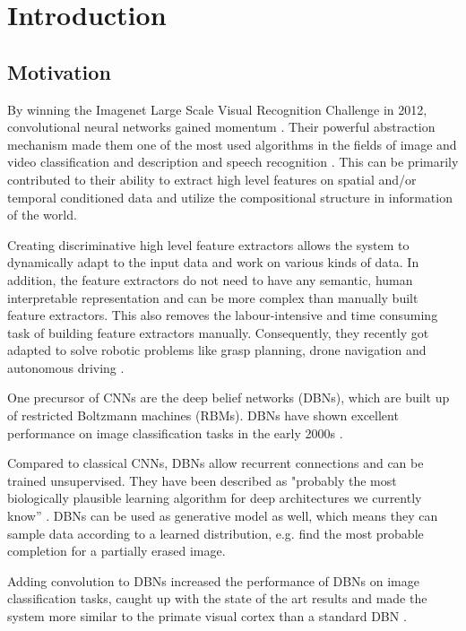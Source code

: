 \chapter{Introduction}

\section{Motivation} \label{c:motiv}

By winning the Imagenet Large Scale Visual Recognition Challenge in 2012, convolutional neural networks gained momentum \cite{NIPS2012_4824}. 
Their powerful abstraction mechanism made them one of the most used algorithms in the fields of image and video classification and description and speech recognition \cite{abdel2014convolutional}\cite{karpathy2014large}\cite{LeCun2015}\cite{szegedy2015going}. 
This can be primarily contributed to their ability to extract high level features on spatial and/or temporal conditioned data and utilize the compositional structure in information of the world.

Creating discriminative high level feature extractors allows the system to dynamically adapt to the input data and work on various kinds of data. 
In addition, the feature extractors do not need to have any semantic, human interpretable representation and can be more complex than manually built feature extractors. 
This also removes the labour-intensive and time consuming task of building feature extractors manually.
Consequently, they recently got adapted to solve robotic problems like grasp planning, drone navigation and autonomous driving \cite{chen2015deepdriving}\cite{giusti2016machine}\cite{levine2016learning}. 

One precursor of CNNs are the deep belief networks (DBNs), which are built up of restricted Boltzmann machines (RBMs). 
DBNs have shown excellent performance on image classification tasks in the early 2000s \cite{hinton2006fast}\cite{lee2009convolutional}.

Compared to classical CNNs, DBNs allow recurrent connections and can be trained unsupervised. 
They have been described as  "probably the most biologically plausible learning algorithm for deep architectures we currently know” \cite{bengio2015towards}. 
DBNs can be used as generative model as well, which means they can sample data according to a learned distribution, e.g. find the most probable completion for a partially erased image.

Adding convolution to DBNs increased the performance of DBNs on image classification tasks, caught up with the state of the art results and made the system more similar to the primate visual cortex than a standard DBN \cite{lee2009convolutional}. 

